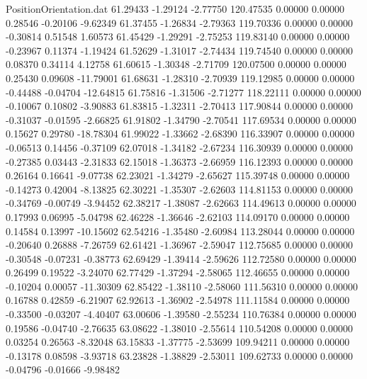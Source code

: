 \begin{filecontents}{PositionOrientation.dat}
  61.29433   -1.29124   -2.77750   120.47535    0.00000    0.00000    0.28546   -0.20106   -9.62349
  61.37455   -1.26834   -2.79363   119.70336    0.00000    0.00000   -0.30814    0.51548    1.60573
  61.45429   -1.29291   -2.75253   119.83140    0.00000    0.00000   -0.23967    0.11374   -1.19424
  61.52629   -1.31017   -2.74434   119.74540    0.00000    0.00000    0.08370    0.34114    4.12758
  61.60615   -1.30348   -2.71709   120.07500    0.00000    0.00000    0.25430    0.09608  -11.79001
  61.68631   -1.28310   -2.70939   119.12985    0.00000    0.00000   -0.44488   -0.04704  -12.64815
  61.75816   -1.31506   -2.71277   118.22111    0.00000    0.00000   -0.10067    0.10802   -3.90883
  61.83815   -1.32311   -2.70413   117.90844    0.00000    0.00000   -0.31037   -0.01595   -2.66825
  61.91802   -1.34790   -2.70541   117.69534    0.00000    0.00000    0.15627    0.29780  -18.78304
  61.99022   -1.33662   -2.68390   116.33907    0.00000    0.00000   -0.06513    0.14456   -0.37109
  62.07018   -1.34182   -2.67234   116.30939    0.00000    0.00000   -0.27385    0.03443   -2.31833
  62.15018   -1.36373   -2.66959   116.12393    0.00000    0.00000    0.26164    0.16641   -9.07738
  62.23021   -1.34279   -2.65627   115.39748    0.00000    0.00000   -0.14273    0.42004   -8.13825
  62.30221   -1.35307   -2.62603   114.81153    0.00000    0.00000   -0.34769   -0.00749   -3.94452
  62.38217   -1.38087   -2.62663   114.49613    0.00000    0.00000    0.17993    0.06995   -5.04798
  62.46228   -1.36646   -2.62103   114.09170    0.00000    0.00000    0.14584    0.13997  -10.15602
  62.54216   -1.35480   -2.60984   113.28044    0.00000    0.00000   -0.20640    0.26888   -7.26759
  62.61421   -1.36967   -2.59047   112.75685    0.00000    0.00000   -0.30548   -0.07231   -0.38773
  62.69429   -1.39414   -2.59626   112.72580    0.00000    0.00000    0.26499    0.19522   -3.24070
  62.77429   -1.37294   -2.58065   112.46655    0.00000    0.00000   -0.10204    0.00057  -11.30309
  62.85422   -1.38110   -2.58060   111.56310    0.00000    0.00000    0.16788    0.42859   -6.21907
  62.92613   -1.36902   -2.54978   111.11584    0.00000    0.00000   -0.33500   -0.03207   -4.40407
  63.00606   -1.39580   -2.55234   110.76384    0.00000    0.00000    0.19586   -0.04740   -2.76635
  63.08622   -1.38010   -2.55614   110.54208    0.00000    0.00000    0.03254    0.26563   -8.32048
  63.15833   -1.37775   -2.53699   109.94211    0.00000    0.00000   -0.13178    0.08598   -3.93718
  63.23828   -1.38829   -2.53011   109.62733    0.00000    0.00000   -0.04796   -0.01666   -9.98482

\end{filecontents}
